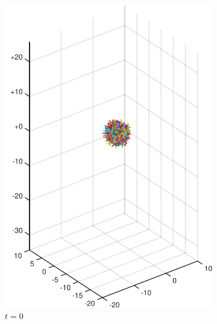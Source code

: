 \documentclass[a4paper,11pt]{kth-mag}
\begin{document}
\begin{figure}
  \centering
  \begin{subfigure}[h]{0.4\textwidth}
    \centering
    \includegraphics[width=\textwidth]{img/sphere_00000.pdf}
    \caption{$t=0$}\label{fig:sphere_simulation_1a}
  \end{subfigure}
  \begin{subfigure}[h]{0.4\textwidth}
    \centering

\end{subfigure}
\end{figure}
\end{document}
